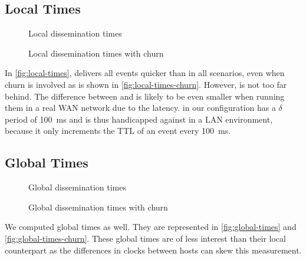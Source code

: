 \subsection{Local Times}
\label{sub:local-times}
\begin{figure*}[htp]
	\centering
	
	\vspace{-2mm} 
	\caption{Local dissemination times}
	\vspace{-2mm}
	\label{fig:local-times} 
\end{figure*}

\begin{figure}[htp]
	\centering
	
	\vspace{-2mm} 
	\caption{Local dissemination times with churn}
	\vspace{-2mm} 
	\label{fig:local-times-churn} 
\end{figure}
In \autoref{fig:local-times}, \jgroups delivers all events quicker than \epto in all scenarios, even when churn is involved as is shown in \autoref{fig:local-times-churn}. However, \epto is not too far behind. The difference between \epto and \jgroups is likely to be even smaller when running them in a real WAN network due to the latency. \epto in our configuration has a $\delta$ period of \SI{100}{\milli\second} and is thus handicapped against \jgroups in a LAN environment, because it only increments the TTL of an event every \SI{100}{\milli\second}.
\newpage
\subsection{Global Times}
\begin{figure*}[htp]
	\centering
	
	\vspace{-2mm} 
	\caption{Global dissemination times}
	\vspace{-2mm}
	\label{fig:global-times}  
\end{figure*}

\begin{figure}[htp]
	\centering
	
	\vspace{-2mm} 
	\caption{Global dissemination times with churn}
	\vspace{-2mm} 
	\label{fig:global-times-churn} 
\end{figure}
We computed global times as well. They are represented in \autoref{fig:global-times} and \autoref{fig:global-times-churn}. These global times are of less interest than their local counterpart as the differences in clocks between hosts can skew this measurement.


